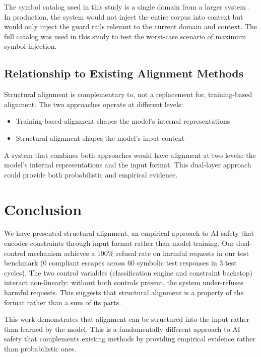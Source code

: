 \documentclass[11pt]{article}
\begin{document}
The symbol catalog used in this study is a single domain from a larger system \cite{signalzero_desktop}. In production, the system would not inject the entire corpus into context but would only inject the guard rails relevant to the current domain and context. The full catalog was used in this study to test the worst-case scenario of maximum symbol injection.

\subsection{Relationship to Existing Alignment Methods}

Structural alignment is complementary to, not a replacement for, training-based alignment. The two approaches operate at different levels:
\begin{itemize}[noitemsep,topsep=0pt]
    \item Training-based alignment shapes the model's internal representations
    \item Structural alignment shapes the model's input context
\end{itemize}

A system that combines both approaches would have alignment at two levels: the model's internal representations and the input format. This dual-layer approach could provide both probabilistic and empirical evidence.

\section{Conclusion}

We have presented structural alignment, an empirical approach to AI safety that encodes constraints through input format rather than model training. Our dual-control mechanism achieves a $100\%$ refusal rate on harmful requests in our test benchmark ($0$ compliant escapes across $60$ symbolic test responses in $3$ test cycles). The two control variables (classification engine and constraint backstop) interact non-linearly: without both controls present, the system under-refuses harmful requests. This suggests that structural alignment is a property of the format rather than a sum of its parts.

This work demonstrates that alignment can be structured into the input rather than learned by the model. This is a fundamentally different approach to AI safety that complements existing methods by providing empirical evidence rather than probabilistic ones.
\end{document}

